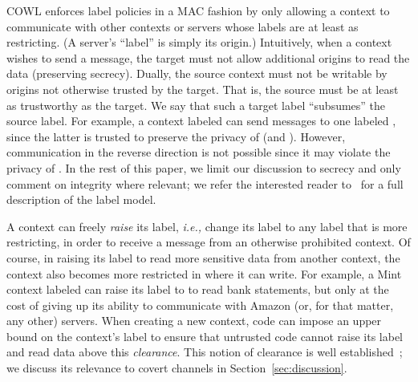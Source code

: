 COWL enforces label policies in a MAC fashion by only allowing a context
to communicate with other contexts or servers whose labels are at
least as restricting. (A server's ``label'' is simply its origin.)
%
Intuitively, when a context wishes to send a message, the target must
not allow additional origins to read the data (preserving secrecy).
Dually, the source context must not be writable by origins not
otherwise trusted by the target. That is, the source must be at least
as trustworthy as the target.
%
We say that such a target label ``subsumes'' the source
label.
%
For example, a context labeled
 can send messages to
one labeled , since the latter is trusted
to preserve the privacy of  (and
).
%
However, communication in the reverse direction is not possible since
it may violate the privacy of .
%
In the rest of this paper, we limit our discussion to secrecy and only
comment on integrity where relevant; we refer the interested reader
to~\cite{stefan:2011:dclabels} for a full description of the label
model.

A context can freely \emph{raise} its label, \emph{i.e.,} change its label to
any label that is more restricting, in order to receive a message
from an otherwise prohibited context.
%
Of course, in raising its label to read more sensitive data from
another context, the context also becomes more restricted in where it
can write.
%
For example, a Mint context labeled
 can raise its label to
 to read bank statements, but
only at the cost of giving up its ability to communicate with Amazon
(or, for that matter, any other) servers.
%
When creating a new context, code can impose an upper bound on the
context's label to ensure that untrusted code cannot raise its label
and read data above this \emph{clearance}.
%
This notion of clearance is well
established~\cite{efstathopoulos:asbestos, Zeldovich:2006,
  stefan:2011:flexible, Breeze13}; we discuss its relevance to covert
channels in Section~\ref{sec:discussion}.

